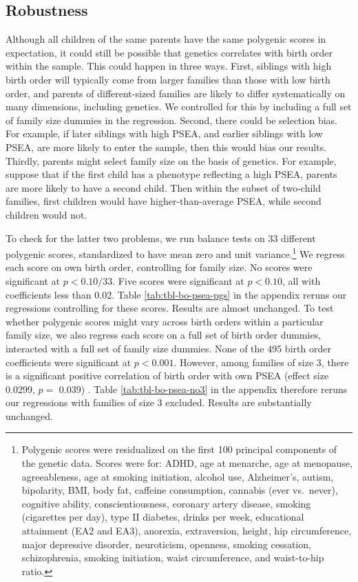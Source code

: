 \documentclass[
]{article}
\begin{document}
\FloatBarrier

\hypertarget{robustness}{%
\subsection{Robustness}\label{robustness}}

Although all children of the same parents have the same polygenic scores
in expectation, it could still be possible that genetics correlates with
birth order within the sample. This could happen in three ways. First,
siblings with high birth order will typically come from larger families
than those with low birth order, and parents of different-sized families
are likely to differ systematically on many dimensions, including
genetics. We controlled for this by including a full set of family size
dummies in the regression. Second, there could be selection bias. For
example, if later siblings with high PSEA, and earlier siblings with low
PSEA, are more likely to enter the sample, then this would bias our
results. Thirdly, parents might select family size on the basis of
genetics. For example, suppose that if the first child has a phenotype
reflecting a high PSEA, parents are more likely to have a second child.
Then within the subset of two-child families, first children would have
higher-than-average PSEA, while second children would not.

To check for the latter two problems, we run balance tests on 33
different polygenic scores, standardized to have mean zero and unit
variance.\footnote{Polygenic scores were residualized on the first 100 principal
  components of the genetic data. Scores were for: ADHD, age at
  menarche, age at menopause, agreeableness, age at smoking
  initiation, alcohol use, Alzheimer's, autism, bipolarity, BMI, body
  fat, caffeine consumption, cannabis (ever vs.~never), cognitive
  ability, conscientiousness, coronary artery disease, smoking
  (cigarettes per day), type II diabetes, drinks per week, educational
  attainment (EA2 and EA3), anorexia, extraversion, height, hip
  circumference, major depressive disorder, neuroticism, openness,
  smoking cessation, schizophrenia, smoking initiation, waist
  circumference, and waist-to-hip ratio.} We regress each score on own birth order, controlling for
family size. No scores were significant at \(p < 0.10/33\). Five scores
were significant at \(p < 0.10\), all with coefficients less than 0.02.
Table \ref{tab:tbl-bo-psea-pgs} in the appendix reruns our regressions
controlling for these scores. Results are almost unchanged. To test
whether polygenic scores might vary across birth orders within a
particular family size, we also regress each score on a full set of
birth order dummies, interacted with a full set of family size dummies.
None of the 495 birth order coefficients were significant
at \(p < 0.001\). However, among families of size 3, there is a
significant positive correlation of birth order with own PSEA (effect
size 0.0299, \(p =\)
0.039) . Table \ref{tab:tbl-bo-psea-no3} in
the appendix therefore reruns our regressions with families of size 3
excluded. Results are substantially unchanged.
\end{document}
